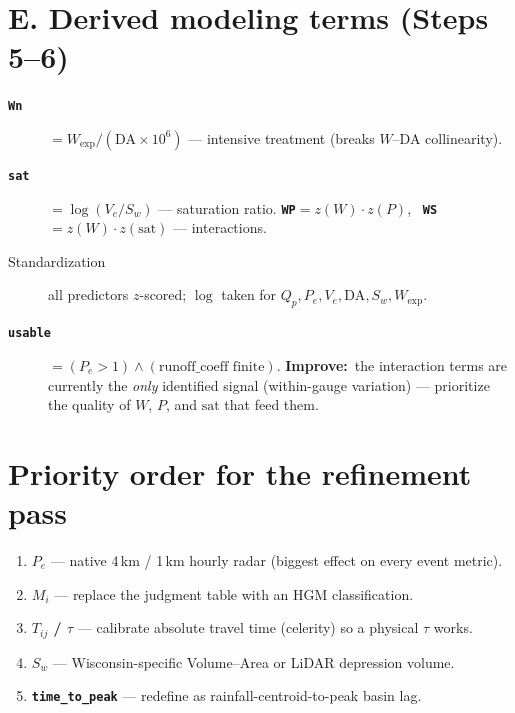 \documentclass[11pt]{article}
\newcommand{\imp}{\textcolor{impcol}{\textbf{Improve:}}\ }
\newcommand{\var}[1]{\textbf{\texttt{#1}}}
\begin{document}
\section{E. Derived modeling terms (Steps 5--6)}
\begin{description}
\item[\var{Wn}] $=W_{\exp}/(\text{DA}\times10^6)$ --- intensive treatment (breaks $W$--DA collinearity).
\item[\var{sat}] $=\log(V_e/S_w)$ --- saturation ratio. \quad
\var{WP}$=z(W)\!\cdot\!z(P)$, \ \var{WS}$=z(W)\!\cdot\!z(\text{sat})$ --- interactions.
\item[Standardization] all predictors $z$-scored; $\log$ taken for $Q_p,P_e,V_e,\text{DA},S_w,W_{\exp}$.
\item[\var{usable}] $=(P_e>1)\wedge(\text{runoff\_coeff finite})$.
\imp the interaction terms are currently the \emph{only} identified signal (within-gauge variation) ---
prioritize the quality of $W$, $P$, and $\text{sat}$ that feed them.
\end{description}

\section*{Priority order for the refinement pass}
\begin{enumerate}[leftmargin=1.6em,itemsep=2pt]
\item \textbf{$P_e$} --- native 4\,km / 1\,km hourly radar (biggest effect on every event metric).
\item \textbf{$M_i$} --- replace the judgment table with an HGM classification.
\item \textbf{$T_{ij}$ / $\tau$} --- calibrate absolute travel time (celerity) so a physical $\tau$ works.
\item \textbf{$S_w$} --- Wisconsin-specific Volume--Area or LiDAR depression volume.
\item \textbf{\texttt{time\_to\_peak}} --- redefine as rainfall-centroid-to-peak basin lag.
\end{enumerate}
\end{document}
